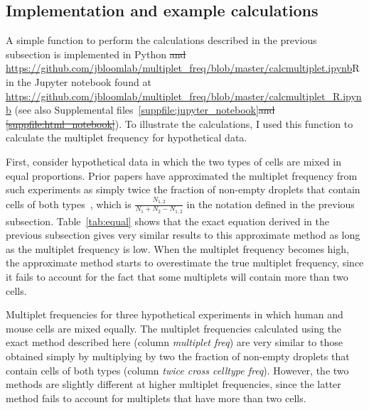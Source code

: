 \documentclass[fleqn,10pt,lineno]{wlpeerj} %
\providecommand{\DIFaddtex}[1]{{\protect\color{blue}\uwave{#1}}} %
\providecommand{\DIFdeltex}[1]{{\protect\color{red}\sout{#1}}}                      %
\providecommand{\DIFaddbegin}{} %
\providecommand{\DIFaddend}{} %
\providecommand{\DIFdelbegin}{} %
\providecommand{\DIFdelend}{} %
\providecommand{\DIFadd}[1]{\texorpdfstring{\DIFaddtex{#1}}{#1}} %
\providecommand{\DIFdel}[1]{\texorpdfstring{\DIFdeltex{#1}}{}} %
\begin{document}
\subsection*{Implementation and example calculations}
A simple function to perform the calculations described in the previous subsection is implemented in Python \DIFdelbegin \DIFdel{and }\DIFdelend \DIFaddbegin \DIFadd{in the Jupyter notebook found at
}\url{https://github.com/jbloomlab/multiplet_freq/blob/master/calcmultiplet.ipynb}\DIFadd{, and in }\DIFaddend R in the Jupyter notebook found at \DIFdelbegin %
\DIFdelend \DIFaddbegin \url{https://github.com/jbloomlab/multiplet_freq/blob/master/calcmultiplet_R.ipynb} \DIFaddend (see also Supplemental files~\ref{suppfile:jupyter_notebook}\DIFdelbegin \DIFdel{and \ref{suppfile:html_notebook}}\DIFdelend \DIFaddbegin \DIFadd{, \ref{suppfile:html_notebook}, ~\ref{suppfile:jupyter_notebook_R}, and \ref{suppfile:html_notebook_R}}\DIFaddend ).
To illustrate the calculations, I used this function to calculate the multiplet frequency for hypothetical data.

First, consider hypothetical data in which the two types of cells are mixed in equal proportions.
Prior papers have approximated the multiplet frequency from such experiments as simply twice the fraction of non-empty droplets that contain cells of both types~\citep{klein2015droplet,macosko2015highly,zheng2017massively,cao2017comprehensive}, which is $\frac{N_{1,2}}{N_1 + N_2 - N_{1,2}}$ in the notation defined in the previous subsection. 
Table~\ref{tab:equal} shows that the exact equation derived in the previous subsection gives very similar results to this approximate method as long as the multiplet frequency is low.
When the multiplet frequency becomes high, the approximate method starts to overestimate the true multiplet frequency, since it fails to account for the fact that some multiplets will contain more than two cells.

\begin{table}[b]
\centering

\caption{\label{tab:equal}
Multiplet frequencies for three hypothetical experiments in which human and mouse cells are mixed equally.
The multiplet frequencies calculated using the exact method described here (column \emph{multiplet freq}) are very similar to those obtained simply by multiplying by two the fraction of non-empty droplets that contain cells of both types (column \emph{twice cross celltype freq}).
However, the two methods are slightly different at higher multiplet frequencies, since the latter method fails to account for multiplets that have more than two cells.}
\end{table}
\end{document}
